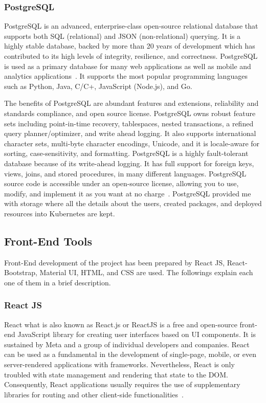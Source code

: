 \subsubsection{PostgreSQL}
PostgreSQL is an advanced, enterprise-class open-source relational database that supports both SQL (relational) and JSON (non-relational) querying. It is a highly stable database, backed by more than 20 years of development which has contributed to its high levels of integrity, resilience, and correctness. PostgreSQL is used as a primary database for many web applications as well as mobile and analytics applications~\cite{postgresql}. It supports the most popular programming languages such as Python, Java, C/C+, JavaScript (Node.js), and Go.

The benefits of PostgreSQL are abundant features and extensions, reliability and standards compliance, and open source license. PostgreSQL owns robust feature sets including point-in-time recovery, tablespaces, nested transactions, a refined query planner/optimizer, and write ahead logging. It also supports international character sets, multi-byte character encodings, Unicode, and it is locale-aware for sorting, case-sensitivity, and formatting. PostgreSQL is a highly fault-tolerant database because of its write-ahead logging. It has full support for foreign keys, views, joins, and stored procedures, in many different languages. PostgreSQL source code is accessible under an open-source license, allowing you to use, modify, and implement it as you want at no charge~\cite{what-is-the-postgresql}. PostgreSQL provided me with storage where all the details about the users, created packages, and deployed resources into Kubernetes are kept.

\subsection{Front-End Tools}
Front-End development of the project has been prepared by React JS, React-Bootstrap, Material UI, HTML, and CSS are used. The followings explain each one of them in a brief description.

\subsubsection{React JS}
React what is also known as React.js or ReactJS is a free and open-source front-end JavaScript library for creating user interfaces based on UI components. It is sustained by Meta and a group of individual developers and companies. React can be used as a fundamental in the development of single-page, mobile, or even server-rendered applications with frameworks. Nevertheless, React is only troubled with state management and rendering that state to the DOM. Consequently, React applications usually requires the use of supplementary libraries for routing and other client-side functionalities~\cite{react-js-wiki}.

